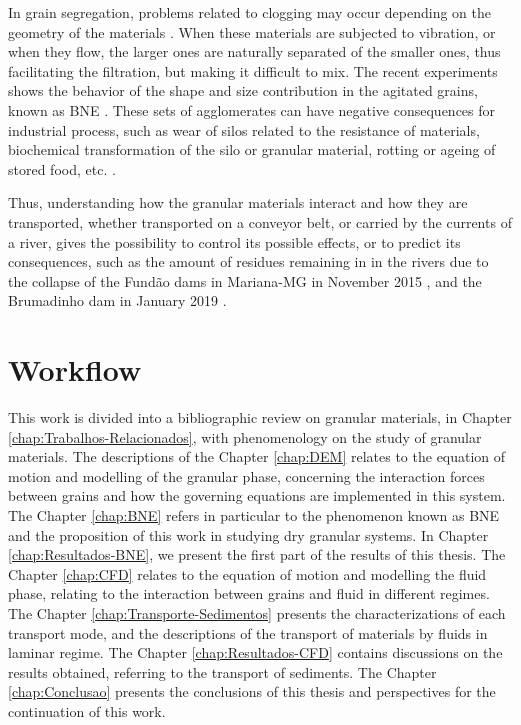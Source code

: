     In grain segregation, problems related to clogging may occur depending on the geometry of the materials \cite{Caio-Tese}. When these materials are subjected to vibration, or when they flow, the larger ones are naturally separated of the smaller ones, thus facilitating the filtration, but making it difficult to mix. The recent experiments shows the behavior of the shape and size contribution in the agitated grains, known as BNE \cite{Size_segregation_of_irregular_granular_materials_captured_by_time-resolved_3D_imaging}. These sets of agglomerates can have negative consequences for industrial process, such as wear of silos related to the resistance of materials, biochemical transformation of the silo or granular material, rotting or ageing of stored food, etc. \cite{Silo_failures}.

    Thus, understanding how the granular materials interact and how they are transported, whether transported on a conveyor belt, or carried by the currents of a river, gives the possibility to control its possible effects, or to predict its consequences, such as the amount of residues remaining in in the rivers due to the collapse of the Fundão dams in Mariana-MG in November 2015 \cite{Mariana_en, Mariana_pt, Mariana_fr}, and the Brumadinho dam in January 2019 \cite{Brumadinho_en, Brumadinho_pt, Brumadinho_fr}.

\section{Workflow}
\label{sec:organizacaoTrabalho}
    This work is divided into a bibliographic review on granular materials, in Chapter \ref{chap:Trabalhos-Relacionados}, with phenomenology on the study of granular materials. The descriptions of the Chapter \ref{chap:DEM} relates to the equation of motion and modelling of the granular phase, concerning the interaction forces between grains and how the governing equations are implemented in this system. The Chapter \ref{chap:BNE} refers in particular to the phenomenon known as BNE and the proposition of this work in studying dry granular systems. In Chapter \ref{chap:Resultados-BNE}, we present the first part of the results of this thesis. The Chapter \ref{chap:CFD} relates to the equation of motion and modelling the fluid phase, relating to the interaction between grains and fluid in different regimes. The Chapter \ref{chap:Transporte-Sedimentos} presents the characterizations of each transport mode, and the descriptions of the transport of materials by fluids in laminar regime. The Chapter \ref{chap:Resultados-CFD} contains discussions on the results obtained, referring to the transport of sediments. The Chapter \ref{chap:Conclusao} presents the conclusions of this thesis and perspectives for the continuation of this work.
